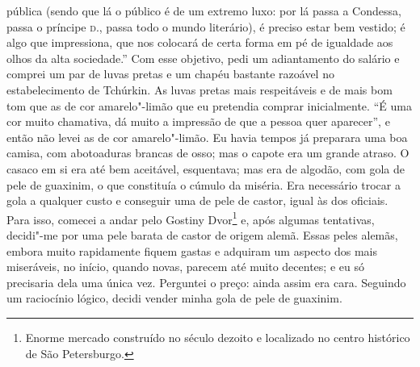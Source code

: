 pública (sendo que lá o público é de um extremo luxo: por lá passa a
Condessa, passa o príncipe \textsc{d.}, passa todo o mundo literário), é preciso
estar bem vestido; é algo que impressiona, que nos colocará de certa
forma em pé de igualdade aos olhos da alta sociedade.'' Com esse
objetivo, pedi um adiantamento do salário e comprei um par de luvas
pretas e um chapéu bastante razoável no estabelecimento de Tchúrkin. As
luvas pretas mais respeitáveis e de mais bom tom que as de cor
amarelo"-limão que eu pretendia comprar inicialmente. ``É uma cor muito
chamativa, dá muito a impressão de que a pessoa quer aparecer'', e então
não levei as de cor amarelo"-limão. Eu havia tempos já preparara uma boa
camisa, com abotoaduras brancas de osso; mas o capote era um grande
atraso. O casaco em si era até bem aceitável, esquentava; mas era de
algodão, com gola de pele de guaxinim, o que constituía o cúmulo da
miséria. Era necessário trocar a gola a qualquer custo e conseguir uma
de pele de castor, igual às dos oficiais. Para isso, comecei a andar
pelo Gostiny Dvor\footnote{ Enorme mercado construído no século dezoito e
localizado no centro histórico de São Petersburgo.} 
e, após algumas tentativas, decidi"-me por uma
pele barata de castor de origem alemã. Essas peles alemãs, embora muito
rapidamente fiquem gastas e adquiram um aspecto dos mais miseráveis, no
início, quando novas, parecem até muito decentes; e eu só precisaria
dela uma única vez. Perguntei o preço: ainda assim era cara. Seguindo
um raciocínio lógico, decidi vender minha gola de pele de guaxinim.

